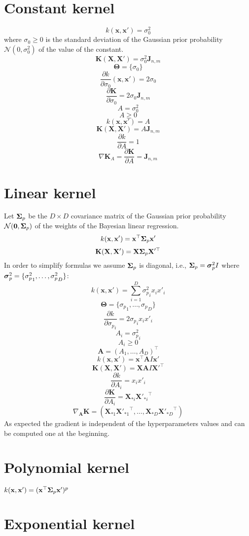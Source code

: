 \documentclass[a4paper,11pt]{article}
\newcommand\x{{\mathbf x}}
\newcommand\X{{\mathbf X}}
\newcommand\K{{\mathbf K}}
\newcommand\J{{\mathbf J}}
\newcommand{\Ivec}[1]{\mbox{\boldmath $#1$}}
\begin{document}
\section{Constant kernel}
$$k(\x,\x') = \sigma_0^2$$
where $\sigma_0 \ge 0$ is the standard deviation of the Gaussian prior
probability $\mathcal{N}(0,\sigma_0^2)$ of the value of the constant.
$$\K(\X,\X') = \sigma_0^2 \J_{n,m}$$
$$\mathbf{\Theta} = \{\sigma_0\}$$
$$\frac{\partial k}{\partial \sigma_0}(\x,\x') = 2\sigma_0$$
$$\frac{\partial \K}{\partial \sigma_0} = 2\sigma_0 \J_{n,m}$$
$$A = \sigma_0^2$$
$$A \ge 0$$
$$k(\x,\x') = A$$
$$\K(\X,\X') = A \J_{n,m}$$
$$\frac{\partial k}{\partial A} = 1$$
$$\nabla \K_A = \frac{\partial \K}{\partial A} = \J_{n,m}$$

\section{Linear kernel}
Let $\Ivec{\Sigma}_p$ be the $D \times D$ covariance matrix of the Gaussian
prior probability $\mathcal{N}(\Ivec{0},\Ivec{\Sigma}_p)$ of the weights of
the Bayesian linear regression.
$$k(\x,\x') = \x^{\top} \Ivec{\Sigma}_p \x'$$
$$\K(\X,\X') = \X \Ivec{\Sigma}_p \X'^{\top}$$
In order to simplify formulas we assume $\Ivec{\Sigma}_p$ is diagonal, i.e.,
$\Ivec{\Sigma}_p = \Ivec{\sigma}^2_p I$ where $\Ivec{\sigma}^2_p =
\{{\sigma^2_p}_1,\ldots,{\sigma^2_p}_D\}$:
$$k(\x,\x') = \sum_{i=1}^D {\sigma^2_p}_i x_i x'_i$$
$$\mathbf{\Theta} = \{{\sigma_p}_1,\ldots,{\sigma_p}_D\}$$
$$\frac{\partial k}{\partial {\sigma_p}_i} = 2 {\sigma_p}_i x_i x'_i$$
$$A_i = {\sigma_p^2}_i$$
$$A_i \ge 0$$
$$\mathbf{A} = (A_1,\ldots,A_D)^{\top}$$
$$k(\x,\x') = \x^{\top} \mathbf{A}I \x'$$
$$\K(\X,\X') = \X \mathbf{A}I \X'^{\top}$$
$$\frac{\partial k}{\partial A_i} = x_i x'_i$$
$$\frac{\partial \K}{\partial A_i} = \X_{* i} {\X'_{* i}}^{\top}$$
$$\nabla_{\mathbf{A}} \K = ( \X_{* 1} {\X'_{* 1}}^{\top}, \ldots, \X_{* D} {\X'_{* D}}^{\top})$$
As expected the gradient is independent of the hyperparameters values
and can be computed one at the beginning.

\section{Polynomial kernel}
$k(\x,\x') = (\x^{\top} \Ivec{\Sigma}_p \x')^p$

\section{Exponential kernel}
\end{document}
